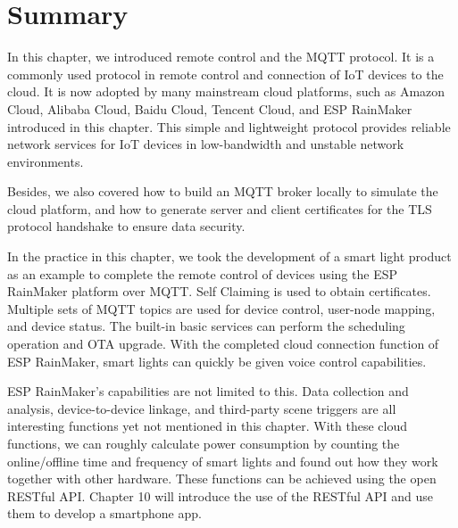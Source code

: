 \documentclass[a4paper,12pt]{book}
\begin{document}
\section{Summary}
In this chapter, we introduced remote control and the MQTT protocol. It is a commonly used protocol in remote control and connection of IoT devices to the cloud. It is now adopted by many mainstream cloud platforms, such as Amazon Cloud, Alibaba Cloud, Baidu Cloud, Tencent Cloud, and ESP RainMaker introduced in this chapter. This simple and lightweight protocol provides reliable network services for IoT devices in low-bandwidth and unstable network environments. 

Besides, we also covered how to build an MQTT broker locally to simulate the cloud platform, and how to generate server and client certificates for the TLS protocol handshake to ensure data security.

In the practice in this chapter, we took the development of a smart light product as an example to complete the remote control of devices using the ESP RainMaker platform over MQTT. Self Claiming is used to obtain certificates. Multiple sets of MQTT topics are used for device control, user-node mapping, and device status. The built-in basic services can perform the scheduling operation and OTA upgrade. With the completed cloud connection function of ESP RainMaker, smart lights can quickly be given voice control capabilities.

ESP RainMaker’s capabilities are not limited to this. Data collection and analysis, device-to-device linkage, and third-party scene triggers are all interesting functions yet not mentioned in this chapter. With these cloud functions, we can roughly calculate power consumption by counting the online/offline time and frequency of smart lights and found out how they work together with other hardware. These functions can be achieved using the open RESTful API. Chapter 10 will introduce the use of the RESTful API and use them to develop a smartphone app.
\end{document}
